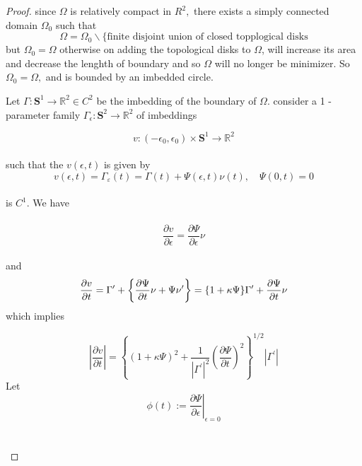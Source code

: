 \documentclass[oneside]{book}
\begin{document}
\begin{proof}

 since $\Omega$ is relatively compact in $R^{2},$ there exists a simply connected
domain $\Omega_{0}$ such that
$$
\Omega=\Omega_{0} \backslash\{\text{finite disjoint union of closed topplogical disks} $$
 but $\Omega_{0}=\Omega $ otherwise on adding the
topological disks to $\Omega$, will increase its area  and decrease the lenghth of boundary and so $\Omega$ will no longer be minimizer. So $\Omega_{0}=\Omega,$ and is bounded by an imbedded circle.\par
Let $\Gamma: \mathbf{S}^{1} \rightarrow \mathbb{R}^{2} \in C^{2}$ be the imbedding of the boundary of $\Omega .$ 
consider a 1 -parameter family $\Gamma_{\epsilon}: \mathbf{S}^{2} \rightarrow \mathbb{R}^{2}$ of imbeddings
\par
$$
v:\left(-\epsilon_{0}, \epsilon_{0}\right) \times \mathbf{S}^{1} \rightarrow \mathbb{R}^{2}
$$ \\
such that the  $v(\epsilon, t)$ is given by \\
    \begin{equation}
    \label{eq10}  
v(\epsilon, t)=\Gamma_{\varepsilon}(t)=\Gamma(t)+\Psi(\epsilon, t) \nu(t), \quad \Psi(0, t)=0
    \end{equation} \\
is $C^{1} .$ We have \\\\
  \begin{equation}
  \label{eq11}  
\frac{\partial v}{\partial \epsilon}=\frac{\partial \Psi}{\partial \epsilon} \nu
    \end{equation}
 \\ 
 and 
     \begin{equation}
     \label{eq12}  
    \\  \frac{\partial v}{\partial t}=\Gamma^{\prime}+\left\{\frac{\partial \Psi}{\partial t} \nu+\Psi \nu^{\prime}\right\}=\{1+\kappa \Psi\} \Gamma^{\prime}+\frac{\partial \Psi}{\partial t} \nu
                   \end{equation}    
which implies  

                    $$\left|\frac{\partial v}{\partial t}\right|=\left\{(1+\kappa \Psi)^{2}+\frac{1}{\left|\Gamma^{\prime}\right|^{2}}\left(\frac{\partial \Psi}{\partial t}\right)^{2}\right\}^{1 / 2}\left|\Gamma^{\prime}\right|$$
Let   \\
                     
                      $$\phi(t):=\left.\frac{\partial \Psi}{\partial \epsilon}\right|_{\epsilon=0}$$ \\\\
                      

\end{proof}
\end{document}

